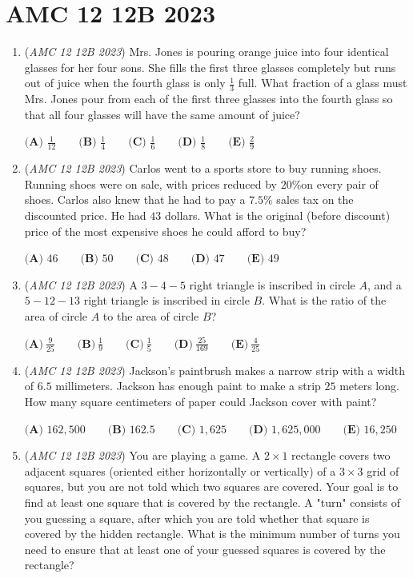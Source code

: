 \section{AMC 12 12B 2023}
        \begin{enumerate}
        	\item (\textit{AMC 12 12B 2023}) Mrs. Jones is pouring orange juice into four identical glasses for her four sons. She fills the first three glasses completely but runs out of juice when the fourth glass is only $\frac{1}{3}$ full. What fraction of a glass must Mrs. Jones pour from each of the first three glasses into the fourth glass so that all four glasses will have the same amount of juice?


 $\textbf{(A) }\frac{1}{12}\qquad\textbf{(B) }\frac{1}{4}\qquad\textbf{(C) }\frac{1}{6}\qquad\textbf{(D) }\frac{1}{8}\qquad\textbf{(E) }\frac{2}{9}$


	\item (\textit{AMC 12 12B 2023}) Carlos went to a sports store to buy running shoes. Running shoes were on sale, with prices reduced by $20\%$on every pair of shoes. Carlos also knew that he had to pay a $7.5\%$ sales tax on the discounted price. He had $43$ dollars. What is the original (before discount) price of the most expensive shoes he could afford to buy?


 $\textbf{(A) }46\qquad\textbf{(B) }50\qquad\textbf{(C) }48\qquad\textbf{(D) }47\qquad\textbf{(E) }49$


	\item (\textit{AMC 12 12B 2023}) A $3-4-5$ right triangle is inscribed in circle $A$, and a $5-12-13$ right triangle is inscribed in circle $B$. What is the ratio of the area of circle $A$ to the area of circle $B$?


 $\textbf{(A)}~\frac{9}{25}\qquad\textbf{(B)}~\frac{1}{9}\qquad\textbf{(C)}~\frac{1}{5}\qquad\textbf{(D)}~\frac{25}{169}\qquad\textbf{(E)}~\frac{4}{25}$


	\item (\textit{AMC 12 12B 2023}) Jackson's paintbrush makes a narrow strip with a width of $6.5$ millimeters. Jackson has enough paint to make a strip $25$ meters long. How many square centimeters of paper could Jackson cover with paint?


 $\textbf{(A) }162,500\qquad\textbf{(B) }162.5\qquad\textbf{(C) }1,625\qquad\textbf{(D) }1,625,000\qquad\textbf{(E) }16,250$


	\item (\textit{AMC 12 12B 2023}) You are playing a game. A $2 \times 1$ rectangle covers two adjacent squares (oriented either horizontally or vertically) of a $3 \times 3$ grid of squares, but you are not told which two squares are covered. Your goal is to find at least one square that is covered by the rectangle. A "turn" consists of you guessing a square, after which you are told whether that square is covered by the hidden rectangle. What is the minimum number of turns you need to ensure that at least one of your guessed squares is covered by the rectangle?



\end{enumerate}
